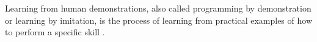 Learning from human demonstrations, also called programming by demonstration or learning by imitation, is the process of learning from practical examples of how to perform a specific skill \cite{schaal1999imitation,argall09survey,lopes10imitationchapter}. 



